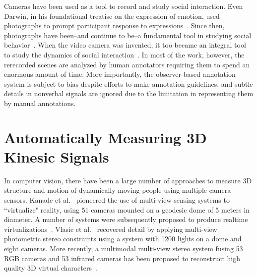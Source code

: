 Cameras have been used as a tool to record and study social interaction. Even Darwin, in his foundational treatise on the expression of emotion, used photographs to prompt participant response to expressions~\cite{Darwin-1872}. Since then, photographs have been--and continue to be--a fundamental tool in studying social behavior~\cite{Hall-1962,Izard-1971,Ekman-1977}. When the video camera was invented, it too became an integral tool to study the dynamics of social interaction~\cite{Muybridge-1887,Yarbus-1967}. In most of the work, however, the rerecorded scenes are analyzed by human annotators requiring them to spend an enormous amount of time. More importantly, the observer-based annotation system is subject to bias despite efforts to make annotation guidelines, and subtle details in nonverbal signals are ignored due to the limitation in representing them by manual annotations. 

\section{Automatically Measuring 3D Kinesic Signals}

In computer vision, there have been a large number of approaches to measure 3D structure and motion of dynamically moving people using multiple camera sensors. Kanade et al.~\cite{Kanade-1997} pioneered the use of multi-view sensing systems to ``virtualize" reality, using 51 cameras mounted on a geodesic dome of 5 meters in diameter. A number of systems were subsequently proposed to produce realtime virtualizations~\cite{Matusik-2000,Matsuyama-2002,Gross-2003,Petit-2009}. Vlasic et al.~\cite{Vlasic-2009} recovered detail by applying multi-view photometric stereo constraints using a system with 1200 lights on a dome and eight cameras. More recently, a multimodal multi-view stereo system fusing 53 RGB cameras and 53 infrared cameras has been proposed to reconstruct high quality 3D virtual characters~\cite{Collet-15}. 

